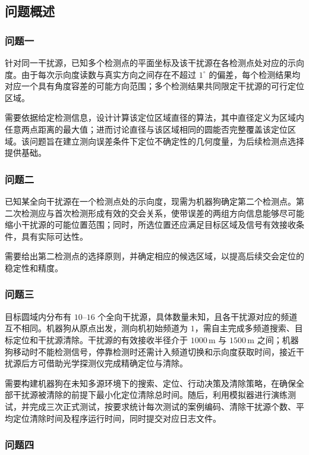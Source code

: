 \documentclass[zihao=-4,a4paper,UTF8,fontset=none]{ctexart}
\begin{document}
\subsection{问题概述}

\subsubsection{问题一}

针对同一干扰源，已知多个检测点的平面坐标及该干扰源在各检测点处对应的示向度。由于每次示向度读数与真实方向之间存在不超过 $1^\circ$ 的偏差，每个检测结果均对应一个具有角度容差的可能方向范围；多个检测结果共同限定干扰源的可行定位区域。

需要依据给定检测信息，设计计算该定位区域直径的算法，其中直径定义为区域内任意两点距离的最大值；进而讨论直径与该区域相同的圆能否完整覆盖该定位区域。该问题旨在建立测向误差条件下定位不确定性的几何度量，为后续检测点选择提供基础。

\subsubsection{问题二}

已知某全向干扰源在一个检测点处的示向度，现需为机器狗确定第二个检测点。第二次检测应与首次检测形成有效的交会关系，使带误差的两组方向信息能够尽可能缩小干扰源的可能位置范围；同时，所选位置还应满足目标区域及信号有效接收条件，具有实际可达性。

需要给出第二检测点的选择原则，并确定相应的候选区域，以提高后续交会定位的稳定性和精度。

\subsubsection{问题三}

目标圆域内分布有 $10$--$16$ 个全向干扰源，具体数量未知，且各干扰源对应的频道互不相同。机器狗从原点出发，测向机初始频道为 $1$，需自主完成多频道搜索、目标定位和干扰源清除。干扰源的有效接收半径介于 $1000\,\mathrm{m}$ 与 $1500\,\mathrm{m}$ 之间；机器狗移动时不能检测信号，停靠检测时还需计入频道切换和示向度获取时间，接近干扰源后方可借助光学探测仪完成精确定位与清除。

需要构建机器狗在未知多源环境下的搜索、定位、行动决策及清除策略，在确保全部干扰源被清除的前提下最小化定位清除总时间。随后，利用模拟器进行演练测试，并完成三次正式测试，按要求统计每次测试的案例编码、清除干扰源个数、平均定位清除时间及程序运行时间，同时提交对应日志文件。

\subsubsection{问题四}
\end{document}
